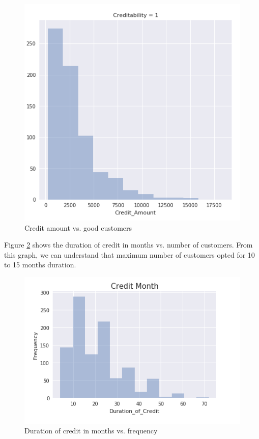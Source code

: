 \documentclass[sigconf]{acmart}
\begin{document}
\begin{figure}[htb]
  \centering
  \includegraphics[width=1.0\columnwidth]{images/Figure9.png}
  \caption{Credit amount vs. good customers
  \cite{german-credit-sri-sai}}
  \label{fig:Figure9} 
\end{figure}

Figure \ref{fig:Figure10} shows the duration of credit in months vs. number of customers. From this graph, we can understand that maximum number of customers opted for 10 to 15 months duration.

\begin{figure}[htb]
  \centering
  \includegraphics[width=1.0\columnwidth]{images/Figure10.png}
  \caption{Duration of credit in months vs. frequency
  \cite{german-credit-sri-sai}}
  \label{fig:Figure10}
\end{figure}
\end{document}
